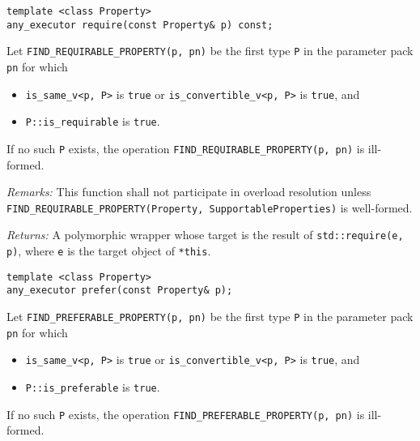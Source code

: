 \documentclass[a4paper,12pt,notitlepage,twoside,openright]{article}
\begin{document}
\begin{verbatim}
template <class Property>
any_executor require(const Property& p) const;
\end{verbatim}

Let \texttt{FIND_REQUIRABLE_PROPERTY(p, pn)} be the first
type \texttt{P} in the parameter pack
\texttt{pn} for which

\begin{itemize}

\item
  \texttt{is_same_v<p, P>} is \texttt{true} or
  \texttt{is_convertible_v<p, P>} is
  \texttt{true}, and
\item
  \texttt{P::is_requirable} is \texttt{true}.
\end{itemize}

If no such \texttt{P} exists, the operation
\texttt{FIND_REQUIRABLE_PROPERTY(p, pn)} is ill-formed.

\emph{Remarks:} This function shall not participate in overload
resolution unless
\texttt{FIND_REQUIRABLE_PROPERTY(Property, SupportableProperties)}
is well-formed.

\emph{Returns:} A polymorphic wrapper whose target is the result of
\texttt{std::require(e, p)}, where \texttt{e} is
the target object of \texttt{*this}.

\begin{verbatim}
template <class Property>
any_executor prefer(const Property& p);
\end{verbatim}

Let \texttt{FIND_PREFERABLE_PROPERTY(p, pn)} be the first
type \texttt{P} in the parameter pack
\texttt{pn} for which

\begin{itemize}

\item
  \texttt{is_same_v<p, P>} is \texttt{true} or
  \texttt{is_convertible_v<p, P>} is
  \texttt{true}, and
\item
  \texttt{P::is_preferable} is \texttt{true}.
\end{itemize}

If no such \texttt{P} exists, the operation
\texttt{FIND_PREFERABLE_PROPERTY(p, pn)} is ill-formed.
\end{document}
